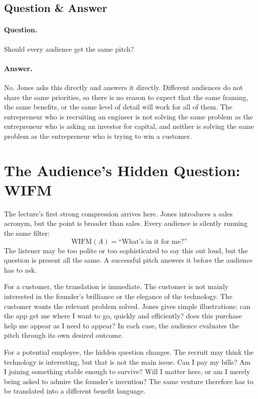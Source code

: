 \subsection{Question \& Answer}

\paragraph{Question.} Should every audience get the same pitch?

\paragraph{Answer.} No. Jones asks this directly and answers it directly. Different audiences do not share the same priorities, so there is no reason to expect that the same framing, the same benefits, or the same level of detail will work for all of them. The entrepreneur who is recruiting an engineer is not solving the same problem as the entrepreneur who is asking an investor for capital, and neither is solving the same problem as the entrepreneur who is trying to win a customer.

\section{The Audience's Hidden Question: WIFM}

The lecture's first strong compression arrives here. Jones introduces a sales acronym, but the point is broader than sales. Every audience is silently running the same filter:
\begin{equation}
\mathrm{WIFM}(A)=\text{``What's in it for me?''}
\end{equation}
The listener may be too polite or too sophisticated to say this out loud, but the question is present all the same. A successful pitch answers it before the audience has to ask.

For a customer, the translation is immediate. The customer is not mainly interested in the founder's brilliance or the elegance of the technology. The customer wants the relevant problem solved. Jones gives simple illustrations: can the app get me where I want to go, quickly and efficiently? does this purchase help me appear as I need to appear? In each case, the audience evaluates the pitch through its own desired outcome.

For a potential employee, the hidden question changes. The recruit may think the technology is interesting, but that is not the main issue. Can I pay my bills? Am I joining something stable enough to survive? Will I matter here, or am I merely being asked to admire the founder's invention? The same venture therefore has to be translated into a different benefit language.

